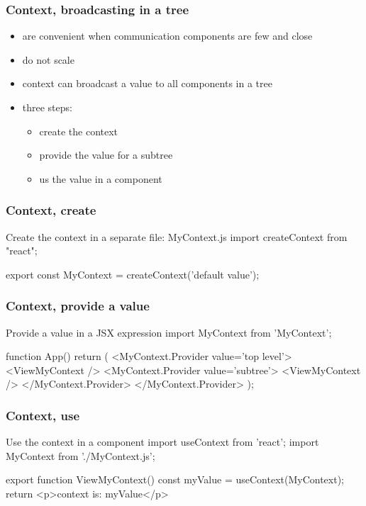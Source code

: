 \begin{frame}[fragile] \frametitle{Context, broadcasting in a tree}
\begin{itemize}
  \item {} are convenient when communication components are few and close
  \item do not scale
  \item context can broadcast a value to all components in a tree
  \item three steps:
  \begin{itemize}
    \item create the context
    \item provide the value for a subtree
    \item us the value in a component
   \end{itemize}
\end{itemize}
\end{frame}

\begin{frame}[fragile] \frametitle{Context, create}

\begin{CodeBox}{Create the context in a separate file: MyContext.js}
import { createContext } from "react";

export const MyContext = createContext('default value');
\end{CodeBox}
\end{frame}

\begin{frame}[fragile] \frametitle{Context, provide a value}
\begin{CodeBox}{Provide a value in a JSX expression}
import { MyContext } from 'MyContext';

function App() {
  return (
    <MyContext.Provider value={'top level'}>
      <ViewMyContext />
      <MyContext.Provider value={'subtree'}>
        <ViewMyContext />
      </MyContext.Provider>
    </MyContext.Provider>
  );
}
\end{CodeBox}
\end{frame}

\begin{frame}[fragile] \frametitle{Context, use}

\begin{CodeBox}{Use the context in a component}
import { useContext } from 'react';
import { MyContext } from './MyContext.js';

export function ViewMyContext() {
  const myValue = useContext(MyContext);
  return <p>context is: {myValue}</p>
}
\end{CodeBox}
\end{frame}

